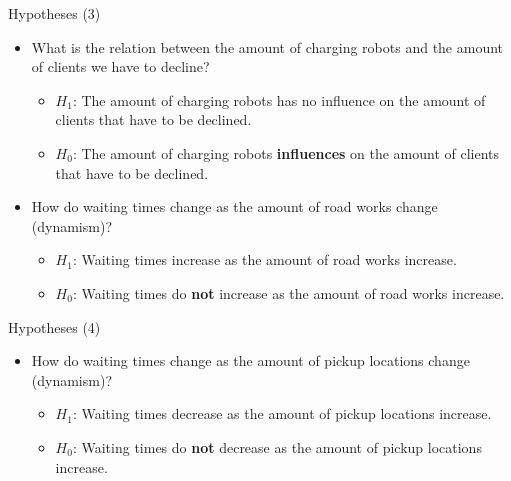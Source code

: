\begin{frame}{Hypotheses (3)}
    \begin{itemize}
        \setlength\itemsep{1.5em}

        \item What is the relation between the amount of charging robots and the amount of clients we have to decline?
            \begin{itemize}
                \item $H_1$: The amount of charging robots has no influence on the amount of clients that have to be declined.
                \item $H_0$: The amount of charging robots \textbf{influences} on the amount of clients that have to be declined.
            \end{itemize}

            \item How do waiting times change as the amount of road works change (dynamism)?
                \begin{itemize}
                    \item $H_1$: Waiting times increase as the amount of road works increase.
                    \item $H_0$: Waiting times do \textbf{not} increase as the amount of road works increase.
                \end{itemize}
    \end{itemize}
\end{frame}

\begin{frame}{Hypotheses (4)}
    \begin{itemize}
        \setlength\itemsep{1.5em}

        \item How do waiting times change as the amount of pickup locations change (dynamism)?
            \begin{itemize}
                \item $H_1$: Waiting times decrease as the amount of pickup locations increase.
                \item $H_0$: Waiting times do \textbf{not} decrease as the amount of pickup locations increase.
            \end{itemize}
    \end{itemize}
\end{frame}
